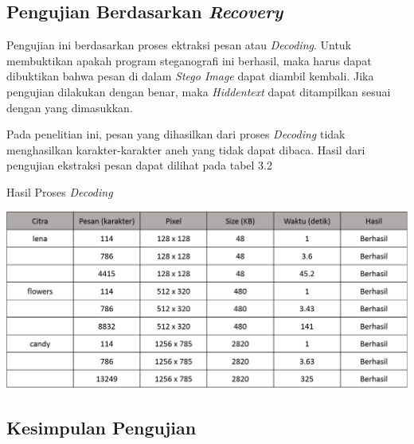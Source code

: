 	\subsection{Pengujian Berdasarkan \emph{Recovery}}
	Pengujian ini berdasarkan proses ektraksi pesan atau \emph{Decoding}. Untuk membuktikan apakah program steganografi ini berhasil, maka harus dapat dibuktikan bahwa pesan di dalam \emph{Stego Image} dapat diambil kembali. Jika pengujian dilakukan dengan benar, maka \emph{Hiddentext} dapat ditampilkan sesuai dengan yang dimasukkan. 
	
	Pada penelitian ini, pesan yang dihasilkan dari proses \emph{Decoding} tidak menghasilkan karakter-karakter aneh yang tidak dapat dibaca. Hasil dari pengujian ekstraksi pesan dapat dilihat pada tabel 3.2
	 
	\begin{table}[H]
		\centering
		\caption{Hasil Proses \emph{Decoding}}
		\includegraphics[width=1.0\textwidth]{gambar/table_hasildecode2}
		\label{tabel_hasildecode2}
	\end{table}
	
	\subsection{Kesimpulan Pengujian}
	